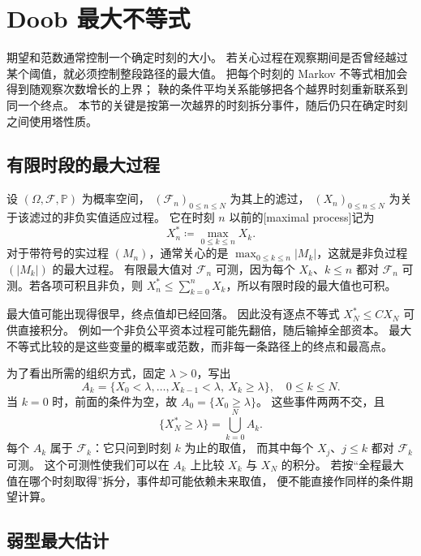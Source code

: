 \section{Doob 最大不等式}
\label{b1:sec:3104}

期望和范数通常控制一个确定时刻的大小。
若关心过程在观察期间是否曾经越过某个阈值，就必须控制整段路径的最大值。
把每个时刻的 Markov 不等式相加会得到随观察次数增长的上界；
鞅的条件平均关系能够把各个越界时刻重新联系到同一个终点。
本节的关键是按第一次越界的时刻拆分事件，随后仍只在确定时刻之间使用塔性质。

\subsection{有限时段的最大过程}
\label{b1:subsec:310401}

设 \((\Omega,\mathcal F,\mathbb P)\) 为概率空间，
\((\mathcal F_n)_{0\leq n\leq N}\) 为其上的滤过，
\((X_n)_{0\leq n\leq N}\) 为关于该滤过的非负实值适应过程。
它在时刻 \(n\) 以前的[maximal process]记为
\[
 X_n^*\coloneqq\max_{0\leq k\leq n}X_k.
\]
对于带符号的实过程 \((M_n)\)，通常关心的是
\(\max_{0\leq k\leq n}|M_k|\)，这就是非负过程 \((|M_k|)\) 的最大过程。
有限最大值对 \(\mathcal F_n\) 可测，因为每个 \(X_k\)、\(k\leq n\)
都对 \(\mathcal F_n\) 可测。若各项可积且非负，则
\(X_n^*\leq\sum_{k=0}^nX_k\)，所以有限时段的最大值也可积。

\ProseParagraphBreak

最大值可能出现得很早，终点值却已经回落。
因此没有逐点不等式 \(X_N^*\leq C X_N\) 可供直接积分。
例如一个非负公平资本过程可能先翻倍，随后输掉全部资本。
最大不等式比较的是这些变量的概率或范数，而非每一条路径上的终点和最高点。

\ProseParagraphBreak

为了看出所需的组织方式，固定 \(\lambda>0\)，写出
\[
 A_k=\{X_0<\lambda,\ldots,X_{k-1}<\lambda,\ X_k\geq\lambda\},
 \quad 0\leq k\leq N.
\]
当 \(k=0\) 时，前面的条件为空，故 \(A_0=\{X_0\geq\lambda\}\)。
这些事件两两不交，且
\[
 \{X_N^*\geq\lambda\}=\bigcup_{k=0}^N A_k.
\]
每个 \(A_k\) 属于 \(\mathcal F_k\)：它只问到时刻 \(k\) 为止的取值，
而其中每个 \(X_j\)、\(j\leq k\) 都对 \(\mathcal F_k\) 可测。
这个可测性使我们可以在 \(A_k\) 上比较 \(X_k\) 与 \(X_N\) 的积分。
若按“全程最大值在哪个时刻取得”拆分，事件却可能依赖未来取值，
便不能直接作同样的条件期望计算。

\subsection{弱型最大估计}
\label{b1:subsec:310402}

